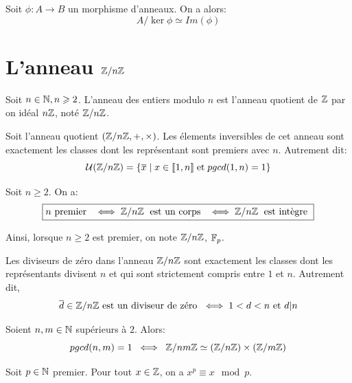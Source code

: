 \begin{theorem}[Isomorphisme]
    Soit $\phi : A \longrightarrow B$ un morphisme d'anneaux. On a alors: 
        \[ \boxed{A/\ker \phi \simeq Im(\phi)} \] 
\end{theorem}


\section{L'anneau $\Z/n\Z$}

\begin{definition}[Anneau $\Z/n\Z$]
    Soit $n \in \mathbb{N}, n \geqslant 2$. L'anneau des entiers modulo $n$ est l'anneau quotient de $\mathbb{Z}$ par on idéal $n\mathbb{Z}$, noté $\Z/n\Z$. 
\end{definition}

\begin{theorem}
    Soit l'anneau quotient $(\mathbb{Z}/n\mathbb{Z}, +,\times)$. Les élements inversibles de cet anneau sont exactement les classes 
    dont les représentant sont premiers avec $n$. Autrement dit: 
        \[ \mathcal{U}(\mathbb{Z}/n\mathbb{Z}) = \{\overline{x} \; | \; x \in \llbracket 1, n \rrbracket \; \text{et} \; pgcd(1,n) = 1\} \] 
\end{theorem}

\begin{theorem}[Fondamental]
    Soit $n \geqslant 2$. On a: 
        \[ \boxed{n \text{ premier } \; \iff \mathbb{Z}/n\mathbb{Z} \; \text{ est un corps } \; \iff \mathbb{Z}/n\mathbb{Z} \; \text{ est intègre }} \] 
\end{theorem}

Ainsi, lorsque $n \geqslant 2$ est premier, on note $\Z/n\Z$, $\mathbb{F}_p$. 

\begin{proposition}
    Les diviseurs de zéro dans l'anneau $\Z/n\Z$ sont exactement les classes dont les représentants divisent $n$ 
    et qui sont strictement compris entre $1$ et $n$. 
    Autrement dit, 
        \[ \overline{d} \in \mathbb{Z}/n\mathbb{Z} \text{ est un diviseur de zéro } \iff 1 < d < n \text{ et } d|n \] 
\end{proposition}

\begin{theorem}[Chinois]
    Soient $n,m \in \mathbb{N}$ supérieurs à $2$. Alors: 
        \[ pgcd(n,m) = 1 \; \iff \; \mathbb{Z}/nm\mathbb{Z} \simeq (\mathbb{Z}/n\mathbb{Z}) \times (\mathbb{Z}/m\mathbb{Z}) \] 
\end{theorem}

\begin{theorem}
    Soit $p \in \mathbb{N}$ premier. Pour tout $x \in \mathbb{Z}$, on a $x^p \equiv x \mod p$. 
\end{theorem}

